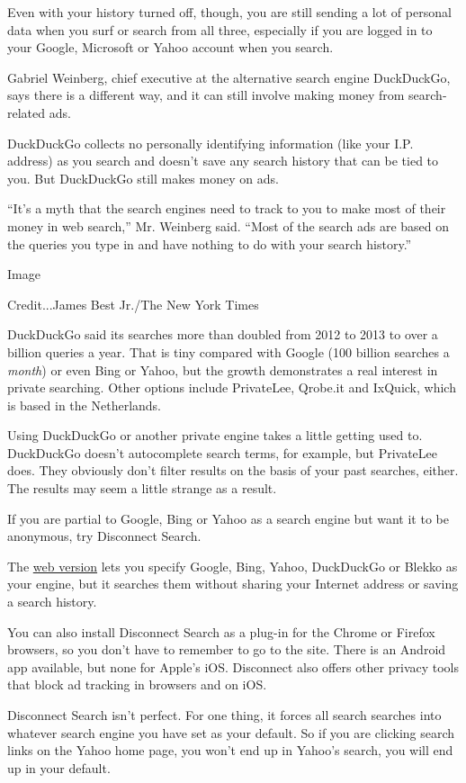 Even with your history turned off, though, you are still sending a lot
of personal data when you surf or search from all three, especially if
you are logged in to your Google, Microsoft or Yahoo account when you
search.

Gabriel Weinberg, chief executive at the alternative search engine
DuckDuckGo, says there is a different way, and it can still involve
making money from search-related ads.

DuckDuckGo collects no personally identifying information (like your
I.P. address) as you search and doesn't save any search history that can
be tied to you. But DuckDuckGo still makes money on ads.

``It's a myth that the search engines need to track to you to make most
of their money in web search,'' Mr. Weinberg said. ``Most of the search
ads are based on the queries you type in and have nothing to do with
your search history.''

Image

Credit...James Best Jr./The New York Times

DuckDuckGo said its searches more than doubled from 2012 to 2013 to over
a billion queries a year. That is tiny compared with Google (100 billion
searches a \emph{month}) or even Bing or Yahoo, but the growth
demonstrates a real interest in private searching. Other options include
PrivateLee, Qrobe.it and IxQuick, which is based in the Netherlands.

Using DuckDuckGo or another private engine takes a little getting used
to. DuckDuckGo doesn't autocomplete search terms, for example, but
PrivateLee does. They obviously don't filter results on the basis of
your past searches, either. The results may seem a little strange as a
result.

If you are partial to Google, Bing or Yahoo as a search engine but want
it to be anonymous, try Disconnect Search.

The \href{https://search.disconnect.me/}{web version} lets you specify
Google, Bing, Yahoo, DuckDuckGo or Blekko as your engine, but it
searches them without sharing your Internet address or saving a search
history.

You can also install Disconnect Search as a plug-in for the Chrome or
Firefox browsers, so you don't have to remember to go to the site. There
is an Android app available, but none for Apple's iOS. Disconnect also
offers other privacy tools that block ad tracking in browsers and on
iOS.

Disconnect Search isn't perfect. For one thing, it forces all search
searches into whatever search engine you have set as your default. So if
you are clicking search links on the Yahoo home page, you won't end up
in Yahoo's search, you will end up in your default.

